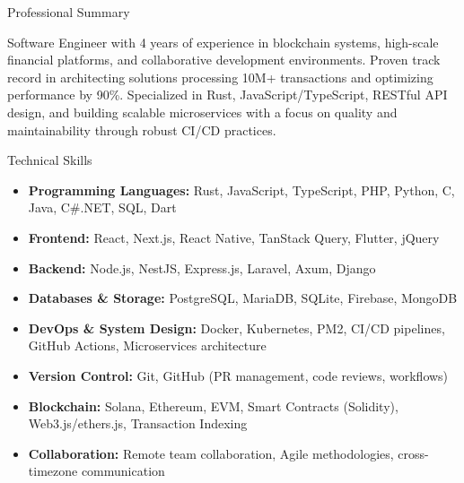 \documentclass[]{mcdowellcv}
\begin{document}
	\makeheader
	
	\begin{cvsection}{Professional Summary}
		\begin{cvsubsection}{}{}{}
      Software Engineer with 4 years of experience in blockchain systems, high-scale financial platforms, and collaborative development environments. Proven track record in architecting solutions processing 10M+ transactions and optimizing performance by 90\%. Specialized in Rust, JavaScript/TypeScript, RESTful API design, and building scalable microservices with a focus on quality and maintainability through robust CI/CD practices.
    \end{cvsubsection}
	\end{cvsection}

  \begin{cvsection}{Technical Skills}
    \begin{cvsubsection}{}{}{}	
      \begin{itemize}
        \item \textbf{Programming Languages:} Rust, JavaScript, TypeScript, PHP, Python, C, Java, C\#.NET, SQL, Dart
        \item \textbf{Frontend:} React, Next.js, React Native, TanStack Query, Flutter, jQuery
        \item \textbf{Backend:} Node.js, NestJS, Express.js, Laravel, Axum, Django
        \item \textbf{Databases \& Storage:} PostgreSQL, MariaDB, SQLite, Firebase, MongoDB
        \item \textbf{DevOps \& System Design:} Docker, Kubernetes, PM2, CI/CD pipelines, GitHub Actions, Microservices architecture
        \item \textbf{Version Control:} Git, GitHub (PR management, code reviews, workflows)
        \item \textbf{Blockchain:} Solana, Ethereum, EVM, Smart Contracts (Solidity), Web3.js/ethers.js, Transaction Indexing
        \item \textbf{Collaboration:} Remote team collaboration, Agile methodologies, cross-timezone communication
      \end{itemize}
    \end{cvsubsection}
  \end{cvsection}	
\end{document}
